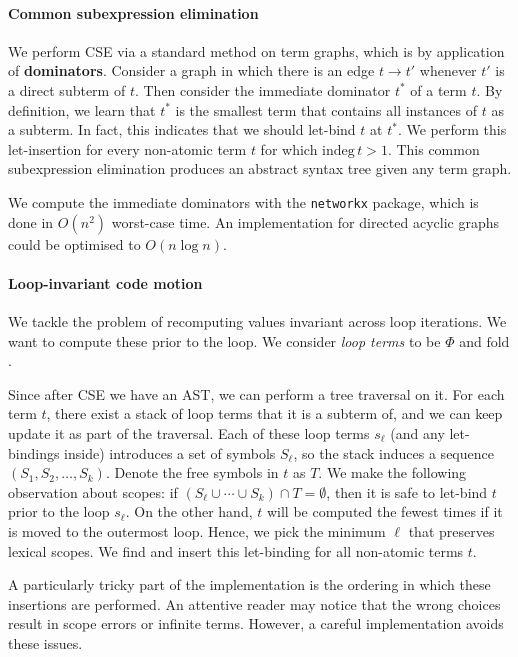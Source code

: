 \paragraph{Common subexpression elimination} We perform CSE via a standard method on term graphs, which is by application of \textbf{dominators}. Consider a graph in which there is an edge $t \to t'$ whenever $t'$ is a direct subterm of $t$. Then consider the immediate dominator $t^*$ of a term $t$. By definition, we learn that $t^*$ is the smallest term that contains all instances of $t$ as a subterm. In fact, this indicates that we should let-bind $t$ at $t^*$. We perform this let-insertion for every non-atomic term $t$ for which $\mathrm{indeg}\,t > 1$. This common subexpression elimination produces an abstract syntax tree given any term graph.

We compute the immediate dominators with the \texttt{networkx} package, which is done in $O(n^2)$ worst-case time. An implementation for directed acyclic graphs could be optimised to $O(n \log n)$.

\paragraph{Loop-invariant code motion} We tackle the problem of recomputing values invariant across loop iterations. We want to compute these prior to the loop. We consider \textit{loop terms} to be $\Phi$ and $\mathrm{fold}$. 

Since after CSE we have an AST, we can perform a tree traversal on it. For each term $t$, there exist a stack of loop terms that it is a subterm of, and we can keep update it as part of the traversal. Each of these loop terms $s_\ell$ (and any let-bindings inside) introduces a set of symbols $S_\ell$, so the stack induces a sequence $(S_1, S_2, \dots, S_k)$. Denote the free symbols in $t$ as $T$. We make the following observation about scopes: if $\left( S_\ell \cup \cdots \cup S_k \right) \cap T = \emptyset$, then it is safe to let-bind $t$ prior to the loop $s_\ell$. On the other hand, $t$ will be computed the fewest times if it is moved to the outermost loop. Hence, we pick the minimum $\ell$ that preserves lexical scopes. We find and insert this let-binding for all non-atomic terms $t$.

A particularly tricky part of the implementation is the ordering in which these insertions are performed. An attentive reader may notice that the wrong choices result in scope errors or infinite terms. However, a careful implementation avoids these issues. 

